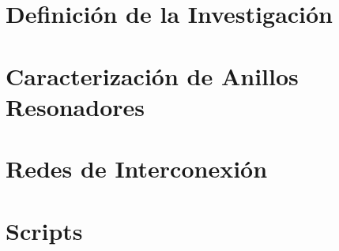 
\makeindex



    
    
    

    \tableofcontents
    \listoffigures
    \listoftables
    \lstlistoflistings    

    \chapter{Definición de la Investigación}
        
 
%    
%    
    
    \chapter{Caracterización de Anillos Resonadores}
    \label{ch:rr}
    
    
    

    \chapter{Redes de Interconexión}
    \label{ch:noc}
    
    


    \appendix
    \chapter{Scripts}
    \label{ch:rr_scripts}
    

    
    


